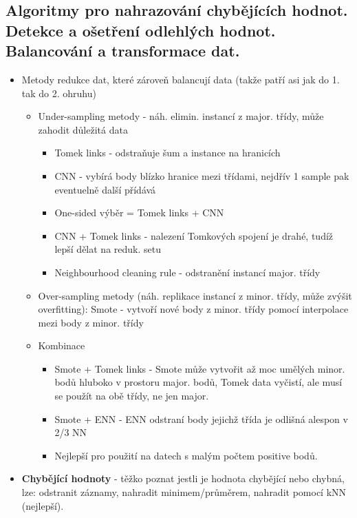 \documentclass[a4paper,hidelinks]{article}
\begin{document}
\subsection{Algoritmy pro nahrazování chybějících hodnot. Detekce a ošetření odlehlých hodnot. Balancování a transformace dat.}

\begin{itemize}
    \item Metody redukce dat, které zároveň balancují data (takže patří asi jak do 1. tak do 2. ohruhu)
        \begin{itemize}
            \item Under-sampling metody - náh. elimin. instancí z major. třídy, může zahodit důležitá data
                \begin{itemize}
                    \item Tomek links - odstraňuje šum a instance na hranicích
                    \item CNN - vybírá body blízko hranice mezi třídami, nejdřív 1 sample pak eventuelně další přídává
                    \item One-sided výběr = Tomek links + CNN
                    \item CNN + Tomek links - nalezení Tomkových spojení je drahé, tudíž lepší dělat na reduk. setu
                    \item Neighbourhood cleaning rule - odstranění instancí major. třídy
                \end{itemize}
            \item Over-sampling metody (náh. replikace instancí z minor. třídy, může zvýšit overfitting): Smote - vytvoří nové body z minor. třídy pomocí interpolace mezi body z minor. třídy
            \item Kombinace 
            \begin{itemize}
                \item Smote + Tomek links - Smote může vytvořit až moc umělých minor. bodů hluboko v prostoru major. bodů, Tomek data vyčistí, ale musí se použít na obě třídy, ne jen major.
                \item Smote + ENN - ENN odstraní body jejichž třída je odlišná alespon v 2/3 NN
                \item Nejlepší pro použití na datech s malým počtem positive bodů.
            \end{itemize}
        \end{itemize}
    \item \textbf{Chybějící hodnoty} - těžko poznat jestli je hodnota chybějící nebo chybná, lze: odstranit záznamy, nahradit minimem/průměrem, nahradit pomocí kNN (nejlepší).

\end{itemize}
\end{document}
